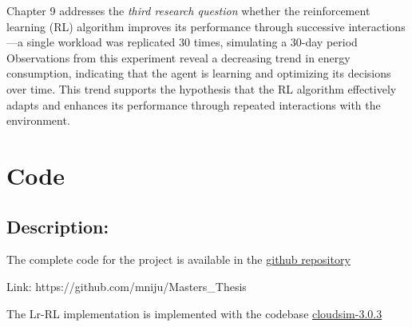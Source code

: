 \documentclass[a4paper,12pt]{Classes/RoboticsLaTeX}
\begin{document}
        Chapter 9  addresses the \textit{third research question} whether the reinforcement learning (RL) algorithm improves its performance through successive interactions—a single workload was replicated 30 times, simulating a 30-day period Observations from this experiment reveal a decreasing trend in energy consumption, indicating that the agent is learning and optimizing its decisions over time. This trend supports the hypothesis that the RL algorithm effectively adapts and enhances its performance through repeated interactions with the environment.

        
	 
	\renewcommand{\bibname}{References}           %
	
	
	\appendix
	\chapter{Code} 
	\label{chap:appendix_a}

         
         \section{Description:}
         The complete code for the project is available in the   \href{https://github.com/mniju/Masters_Thesis}{github repository} 

         Link: https://github.com/mniju/Masters\_Thesis
    
         \noindent The Lr-RL implementation is implemented with the codebase  \href{https://github.com/Cloudslab/cloudsim/releases/tag/cloudsim-3.0.3}{cloudsim-3.0.3}
         
	
\end{document}
